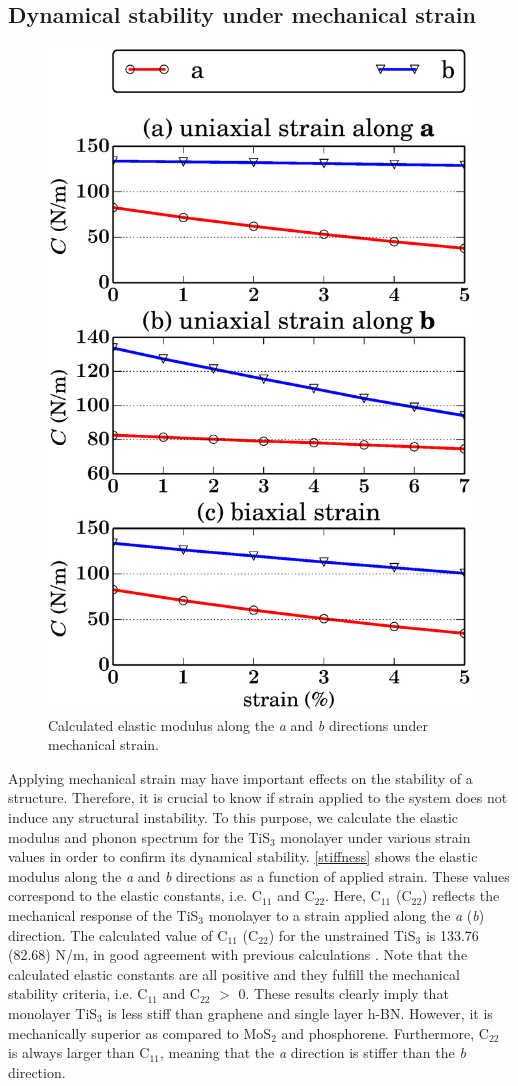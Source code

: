 \subsection{Dynamical stability under  mechanical strain}

\begin{figure}[htb]
\centering
\includegraphics[width=0.6\linewidth]{Mob_stiffness.eps}
\caption{Calculated elastic modulus along the \textit{a} and \textit{b} directions under mechanical strain. \label{stiffness}}	
\end{figure}

Applying mechanical strain may have important effects on the stability of a structure. Therefore, it is crucial to know if  strain applied to the system does not induce any structural instability. To this purpose, we calculate the elastic modulus and phonon spectrum for the TiS$_3$ monolayer under various strain values in order to confirm its dynamical stability.  \autoref{stiffness} shows the elastic modulus along the \textit{a}  and \textit{b}  directions as a function of applied strain. These values correspond to the elastic constants, i.e.  C$_{11}$ and C$_{22}$.  Here, C$_{11}$ (C$_{22}$) reflects the mechanical response of the TiS$_3$ monolayer to a strain applied along the \textit{a} (\textit{b}) direction.  The calculated value of C$_{11}$ (C$_{22}$) for the unstrained TiS$_3$ is 133.76 (82.68) N/m, in good agreement with previous calculations \cite{Dai2015,kang2015m}. Note that the calculated elastic constants are all positive and they fulfill the mechanical stability criteria, i.e. C$_{11}$ and C$_{22}$ $>$ 0. These results clearly imply that monolayer TiS$_3$ is less stiff than graphene and single layer h-BN. However, it is mechanically superior as compared to MoS$_2$ and phosphorene\cite{QHA2}. Furthermore, C$_{22}$ is always larger than C$_{11}$, meaning that the \textit{a} direction is stiffer than the \textit{b} direction. 

